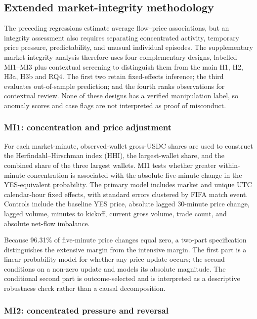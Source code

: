 \subsection{Extended market-integrity methodology}
\label{sec:rq3-integrity-methodology}

The preceding regressions estimate average flow--price associations, but an
integrity assessment also requires separating concentrated activity, temporary
price pressure, predictability, and unusual individual episodes. The supplementary
market-integrity analysis therefore uses four complementary designs, labelled
MI1--MI3 plus contextual screening to distinguish them from the main H1, H2, H3a, H3b and RQ4.
The first two retain fixed-effects inference;
the third evaluates out-of-sample prediction; and the fourth ranks observations
for contextual review. None of these designs has a verified manipulation label,
so anomaly scores and case flags are not interpreted as proof of misconduct.

\subsubsection{MI1: concentration and price adjustment}

For each market-minute, observed-wallet gross-USDC shares are used to construct
the Herfindahl--Hirschman index (HHI), the largest-wallet share, and the combined
share of the three largest wallets. MI1 tests whether greater within-minute
concentration is associated with the absolute five-minute change in the
YES-equivalent probability. The primary model includes market and unique UTC
calendar-hour fixed effects, with standard errors clustered by FIFA match
event. Controls include the baseline YES price, absolute lagged 30-minute price
change, lagged volume, minutes to kickoff, current gross volume, trade count,
and absolute net-flow imbalance.

Because 96.31\% of five-minute price changes equal zero, a two-part
specification distinguishes the extensive margin from the intensive margin.
The first part is a linear-probability model for whether any price update occurs;
the second conditions on a non-zero update and models its absolute magnitude.
The conditional second part is outcome-selected and is interpreted as a
descriptive robustness check rather than a causal decomposition.

\subsubsection{MI2: concentrated pressure and reversal}

